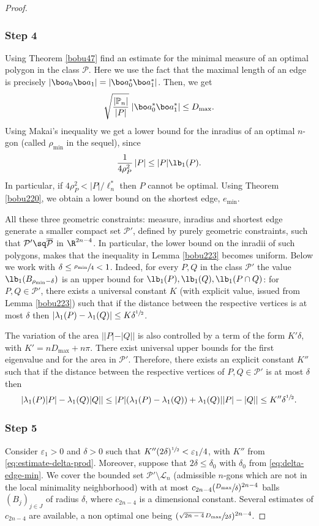 \begin{proof}
\subsubsection*{Step 4} Using Theorem \ref{bobu47} find an estimate for the minimal measure of an optimal polygon in the class $\mathcal P$. Here we use the fact that the maximal length of an edge is precisely $| \bo a_0\bo a_1 | = |\bo a^*_0\bo a^*_1|$. Then, we get
\[
\sqrt{\frac{|\Bbb P_n|}{|P|}}\;
|\bo a_0^* \bo a_1^*|\le D_{\max}.
\]
Using Makai's inequality we get a lower bound for the inradius of an optimal $n$-gon (called $\rho_{\min}$ in the sequel), since
\[
\frac{1}{4\rho_P^2}\,|P|\le |P|\lb_1(P).
\]
In particular, {if $4\rho_P^2 < |P|/\ell_n^*$ then $P$ cannot be optimal.}
Using Theorem \ref{bobu220}, we obtain a lower bound on the shortest edge, $e_{\min}$.

All these three geometric constraints: measure, inradius and shortest edge generate a smaller compact set $\mathcal P' $, defined by purely geometric constraints, such that $\mathcal P' \sq \overline {\mathcal P}$ in $\R^{2n-4}$. In particular, the lower bound on the inradii of such polygons, makes that the inequality in Lemma \ref{bobu223} becomes uniform. Below we work with $\delta \le \sfrac{\rho_{\min}}{4}<1$. Indeed, for every $P, Q$ in the class $\mathcal P' $ the value $ \lb_1(B_{\rho_{\min}- \delta})$ is an upper bound for
$\lb_1(P), \lb_1(Q), \lb_1(P\cap Q)$: for $P,Q \in \mathcal P'$, there exists a universal constant $K$ (with explicit value, issued from Lemma \ref{bobu223}) such that if the distance between the respective vertices is at most $\delta$ then $|\lambda_1(P)-\lambda_1(Q)|\leq K\delta^{\sfrac 12}$.

The variation of the area $||P|-|Q||$ is also controlled by a term of the form $K'\delta $, with $K'= nD_{\max}+ n\pi$. There exist universal upper bounds for the first eigenvalue and for the area in $\mathcal P'$. Therefore, there exists an explicit constant $K''$ such that if the distance between the respective vertices of $P, Q\in \mathcal P'$ is at most $\delta$ then
\begin{equation}
|\lambda_1(P)|P|-\lambda_1(Q)|Q||\leq
|P|(\lambda_1(P)-\lambda_1(Q))+\lambda_1(Q)||P|-|Q|| \leq K''\delta^{\sfrac 12}.
\label{eq:estimate-delta-prod}
\end{equation}

\subsubsection*{Step 5}
Consider $\varepsilon_1>0$ and $\delta>0$ such that $K''(2\delta)^{\sfrac 12}<\varepsilon_1/4$, with $K''$ from \eqref{eq:estimate-delta-prod}. Moreover, suppose that $2\delta\leq \delta_0$ with $\delta_0$ from \eqref{eq:delta-edge-min}. We cover the bounded set $\mathcal P'\setminus \mathcal L_n$ (admissible $n$-gons which are not in the local minimality neighborhood) with at most $c_{2n-4}(\sfrac{D_{\max}}{\delta})^{2n-4}$ balls $(B_j)_{j \in J}$ of radius $\delta$, where $c_{2n-4}$ is a dimensional constant. Several estimates of $c_{2n-4}$ are available, a non optimal one being $(\sfrac{\sqrt{2n-4}\,D_{\max}}{2 \delta})^{2n-4}$.


\end{proof}
